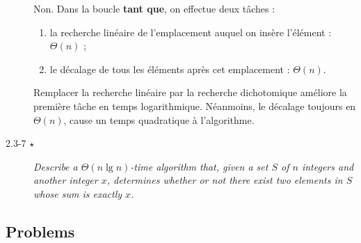 \begin{description}
  \begin{ex}
    Non. Dans la boucle \textbf{tant que}, on effectue deux t\^aches :
    \begin{enumerate}
      \item la recherche lin\'eaire de l'emplacement auquel on ins\`ere l'\'el\'ement : $\Theta (n)$ ;
      \item le d\'ecalage de tous les \'el\'ements apr\`es cet emplacement : $\Theta (n)$.
    \end{enumerate}
    Remplacer la recherche lin\'eaire par la recherche dichotomique am\'eliore la premi\`ere t\^ache en temps logarithmique. N\'eanmoins, le d\'ecalage toujours en $\Theta(n)$, cause un temps quadratique \`a l'algorithme.
  \end{ex}

\item[2.3-7 $\star$] {\itshape Describe a $\Theta (n \lg n)$-time algorithm that, given a set $S$ of $n$ integers and another integer $x$, determines whether or not there exist two elements in $S$ whose sum is exactly $x$.}

  \begin{exrev}
    
  \end{exrev}

\end{description}

\subsection{Problems}

